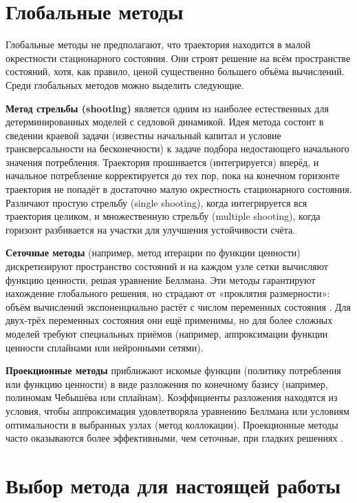 \documentclass[12pt,a4paper]{report}   %
\begin{document}
        \section{Глобальные методы}

            Глобальные методы не предполагают, что траектория находится в малой окрестности стационарного состояния. Они строят решение на всём пространстве состояний, хотя, как правило, ценой существенно большего объёма вычислений. Среди глобальных методов можно выделить следующие.

            \textbf{Метод стрельбы (shooting)} является одним из наиболее естественных для детерминированных моделей с седловой динамикой. Идея метода состоит в сведении краевой задачи (известны начальный капитал и условие трансверсальности на бесконечности) к задаче подбора недостающего начального значения потребления. Траектория прошивается (интегрируется) вперёд, и начальное потребление корректируется до тех пор, пока на конечном горизонте траектория не попадёт в достаточно малую окрестность стационарного состояния. Различают простую стрельбу (single shooting), когда интегрируется вся траектория целиком, и множественную стрельбу (multiple shooting), когда горизонт разбивается на участки для улучшения устойчивости счёта.

            \textbf{Сеточные методы} (например, метод итерации по функции ценности) дискретизируют пространство состояний и на каждом узле сетки вычисляют функцию ценности, решая уравнение Беллмана. Эти методы гарантируют нахождение глобального решения, но страдают от «проклятия размерности»: объём вычислений экспоненциально растёт с числом переменных состояния \cite{judd}. Для двух-трёх переменных состояния они ещё применимы, но для более сложных моделей требуют специальных приёмов (например, аппроксимации функции ценности сплайнами или нейронными сетями).

            \textbf{Проекционные методы} приближают искомые функции (политику потребления или функцию ценности) в виде разложения по конечному базису (например, полиномам Чебышёва или сплайнам). Коэффициенты разложения находятся из условия, чтобы аппроксимация удовлетворяла уравнению Беллмана или условиям оптимальности в выбранных узлах (метод коллокации). Проекционные методы часто оказываются более эффективными, чем сеточные, при гладких решениях \cite{judd, miranda}.
        \section{Выбор метода для настоящей работы}
\end{document}
